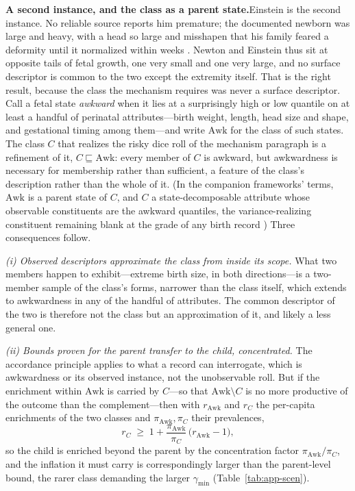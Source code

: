 \documentclass{article}
\begin{document}
\par\medskip\noindent\textbf{A second instance, and the class as a parent state.}\enspace Einstein is the second instance. No reliable source reports him premature; the documented newborn was large and heavy, with a head so large and misshapen that his family feared a deformity until it normalized within weeks \cite{isaacson2007einstein}. Newton and Einstein thus sit at opposite tails of fetal growth, one very small and one very large, and no surface descriptor is common to the two except the extremity itself. That is the right result, because the class the mechanism requires was never a surface descriptor. Call a fetal state \emph{awkward} when it lies at a surprisingly high or low quantile on at least a handful of perinatal attributes---birth weight, length, head size and shape, and gestational timing among them---and write $\mathrm{Awk}$ for the class of such states. The class $C$ that realizes the risky dice roll of the mechanism paragraph is a refinement of it, $C \sqsubseteq \mathrm{Awk}$: every member of $C$ is awkward, but awkwardness is necessary for membership rather than sufficient, a feature of the class's description rather than the whole of it. (In the companion frameworks' terms, $\mathrm{Awk}$ is a parent state of $C$, and $C$ a state-decomposable attribute whose observable constituents are the awkward quantiles, the variance-realizing constituent remaining blank at the grade of any birth record \cite{NexicFoundation}) Three consequences follow.

\emph{(i) Observed descriptors approximate the class from inside its scope.} What two members happen to exhibit---extreme birth size, in both directions---is a two-member sample of the class's forms, narrower than the class itself, which extends to awkwardness in any of the handful of attributes. The common descriptor of the two is therefore not the class but an approximation of it, and likely a less general one.

\emph{(ii) Bounds proven for the parent transfer to the child, concentrated.} The accordance principle applies to what a record can interrogate, which is awkwardness or its observed instance, not the unobservable roll. But if the enrichment within $\mathrm{Awk}$ is carried by $C$---so that $\mathrm{Awk} \setminus C$ is no more productive of the outcome than the complement---then with $r_{\mathrm{Awk}}$ and $r_{C}$ the per-capita enrichments of the two classes and $\pi_{\mathrm{Awk}}, \pi_{C}$ their prevalences,
\begin{equation}\label{eq:app-concentrate}
  r_{C} \;\geq\; 1 + \frac{\pi_{\mathrm{Awk}}}{\pi_{C}}\,\bigl(r_{\mathrm{Awk}} - 1\bigr),
\end{equation}
so the child is enriched beyond the parent by the concentration factor $\pi_{\mathrm{Awk}}/\pi_{C}$, and the inflation it must carry is correspondingly larger than the parent-level bound, the rarer class demanding the larger $\gamma_{\min}$ (Table~\ref{tab:app-scen}).
\end{document}
